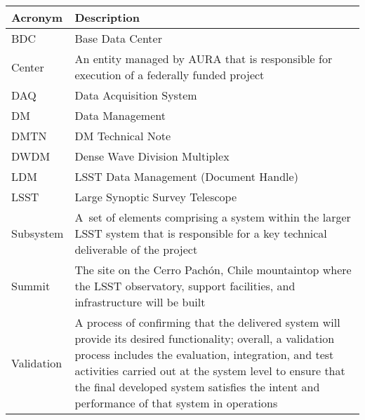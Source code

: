 \addtocounter{table}{-1}
\begin{longtable}{p{}p{}}\hline
\textbf{Acronym} & \textbf{Description}  \\\hline

BDC &  Base Data Center \\\hline
Center & An entity managed by AURA that is responsible for execution of a federally funded project \\\hline
DAQ & Data Acquisition System \\\hline
DM & Data Management \\\hline
DMTN & DM Technical Note \\\hline
DWDM & Dense Wave Division Multiplex \\\hline
LDM & LSST Data Management (Document Handle) \\\hline
LSST & Large Synoptic Survey Telescope \\\hline
Subsystem & A set of elements comprising a system within the larger LSST system that is responsible for a key technical deliverable of the project \\\hline
Summit & The site on the Cerro Pachón, Chile mountaintop where the LSST observatory, support facilities, and infrastructure will be built \\\hline
Validation & A process of confirming that the delivered system will provide its desired functionality; overall, a validation process includes the evaluation, integration, and test activities carried out at the system level to ensure that the final developed system satisfies the intent and performance of that system in operations \\\hline
\end{longtable}
